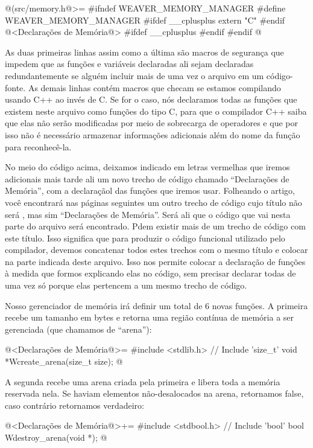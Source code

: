 \iniciocodigo
@(src/memory.h@>=
#ifndef WEAVER_MEMORY_MANAGER
#define WEAVER_MEMORY_MANAGER
#ifdef __cplusplus
extern "C" {
#endif
@<Declarações de Memória@>
#ifdef __cplusplus
}
#endif
#endif
@
\fimcodigo

As duas primeiras linhas assim como a última são macros de segurança
que impedem que as funções e variáveis declaradas ali sejam declaradas
redundantemente se alguém incluir mais de uma vez o arquivo em um
código-fonte. As demais linhas contém macros que checam se estamos
compilando usando C++ ao invés de C. Se for o caso, nós declaramos
todas as funções que existem neste arquivo como funções do tipo C,
para que o compilador C++ saiba que elas não serão modificadas por
meio de sobrecarga de operadores e que por isso não é necessário
armazenar informações adicionais além do nome da função para
reconhecê-la.

No meio do código acima, deixamos indicado em letras vermelhas que
iremos adicionais mais tarde ali um novo trecho de código chamado
``Declarações de Memória'', com a declaraçãol das funções que iremos
usar. Folheando o artigo, você encontrará nas páginas seguintes um
outro trecho de código cujo título não será , mas
sim ``Declarações de Memória''. Será ali que o código que vai nesta
parte do arquivo será encontrado. Pdem existir mais de um trecho de
código com este título. Isso significa que para produzir o código
funcional utilizado pelo compilador, devemos concatenar todos estes
trechos com o mesmo título e colocar na parte indicada deste
arquivo. Isso nos permite colocar a declaração de funções à medida que
formos explicando elas no código, sem precisar declarar todas de uma
vez só porque elas pertencem a um mesmo trecho de código.


Nosso gerenciador de memória irá definir um total de 6 novas
funções. A primeira recebe um tamanho em bytes e retorna uma região
contínua de memória a ser gerenciada (que chamamos de ``arena''):

\iniciocodigo
@<Declarações de Memória@>=
#include <stdlib.h> // Include 'size_t'
void *Wcreate_arena(size_t size);
@
\fimcodigo

A segunda recebe uma arena criada pela primeira e libera toda a memória
reservada nela. Se haviam elementos não-desalocados na arena, retornamos
false, caso contrário retornamos verdadeiro:

\iniciocodigo
@<Declarações de Memória@>+=
#include <stdbool.h> // Include 'bool'
bool Wdestroy_arena(void *);
@
\fimcodigo

